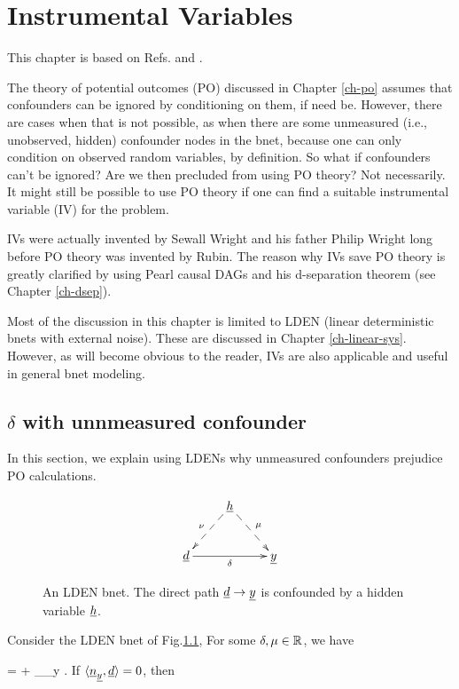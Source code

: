 \chapter{Instrumental Variables}
\label{ch-instrumental}


This chapter is based on
Refs.\cite{book-mixtape} and \cite{wiki-inst-vars}.

The theory of potential outcomes (PO)
discussed in Chapter \ref{ch-po}
assumes that confounders can be ignored
by conditioning on them, if need be.
However, there are cases when
that is not possible, as when there are some
unmeasured (i.e., unobserved, hidden)
confounder nodes in the bnet,
because one can
only condition on observed random 
variables, by definition.
So what if confounders can't be ignored?
Are we then precluded from using PO theory?
Not necessarily.
It might still be possible to
use PO theory if one can find a suitable
instrumental variable (IV) for the problem.

IVs were actually invented 
by Sewall Wright and his father Philip
Wright long before
PO theory was invented  by Rubin.
The reason why IVs save PO theory
is greatly clarified by using
Pearl causal DAGs and his d-separation theorem 
(see Chapter \ref{ch-dsep}).

Most of the discussion in this chapter
is  limited to LDEN (linear deterministic
bnets with external noise). These
are discussed in Chapter \ref{ch-linear-sys}.
However, as will become
obvious to the reader, IVs are 
also applicable
and useful
in general bnet modeling.



\section*{$\delta$ with unnmeasured confounder}

In this section,
we explain using LDENs 
why
unmeasured confounders 
prejudice PO calculations.

\begin{figure}[h!]
$$
\xymatrix{
&\rvh\ar@{-->}[dl]_\nu\ar@{-->}[dr]^\mu
\\
\rvd\ar[rr]_\delta&&\rvy
}$$
\caption{An LDEN bnet. The direct path ${\underline{d}}\rightarrow{\underline{y}}$
is confounded by
a hidden variable ${\underline{h}}$.
} 
\label{fig-iv-G-start}
\end{figure}

Consider 
the LDEN bnet of Fig.\ref{fig-iv-G-start},
For some $\delta, \mu\in { \mathbb{R}}$, we have

\beq
\rvy = \delta \rvd +
\underbrace{ \mu \rvh + \rvu_\rvy}_{\rvn_y}
\;.
\eeq
If $\langle{\underline{n}}_{\underline{y}}, {\underline{d}}\rangle=0$, then

